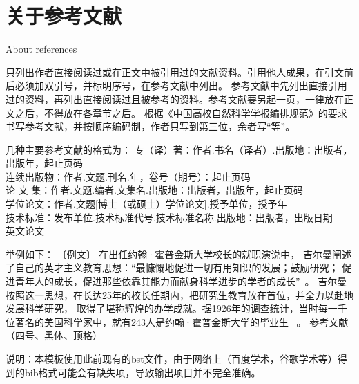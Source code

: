 \chapter{关于参考文献}{About references}

只列出作者直接阅读过或在正文中被引用过的文献资料。引用他人成果，在引文前后必须加双引号，并标明序号，在参考文献中列出。
参考文献中先列出直接引用过的资料，再列出直接阅读过且被参考的资料。参考文献要另起一页，一律放在正文之后，不得放在各章节之后。
根据《中国高校自然科学学报编排规范》的要求书写参考文献，并按顺序编码制，作者只写到第三位，余者写“等”。


几种主要参考文献的格式为：
专（译）著：作者.书名（译者）.出版地：出版者，出版年，起止页码\\
连续出版物：作者.文题.刊名.年，卷号（期号）：起止页码\\
论 文 集：作者.文题.编者.文集名.出版地：出版者，出版年，起止页码\\
学位论文：作者.文题[博士（或硕士）学位论文].授予单位，授予年~\cite{许家林1999岩层移动与控制的关键层理论及其应用}\\
技术标准：发布单位.技术标准代号.技术标准名称.出版地：出版者，出版日期\\
英文论文~\cite{1978Indexing}


举例如下：
〔例文〕 在出任约翰·霍普金斯大学校长的就职演说中，
吉尔曼阐述了自己的英才主义教育思想：“最慷慨地促进一切有用知识的发展；鼓励研究；
促进青年人的成长，促进那些依靠其能力而献身科学进步的学者的成长”~\cite{贺国庆1998德国和美国大学发达史}。 
吉尔曼按照这一思想，在长达25年的校长任期内，把研究生教育放在首位，并全力以赴地发展科学研究，
取得了堪称辉煌的办学成就。据1926年的调查统计，当时每一千位著名的美国科学家中，就有243人是约翰·霍普金斯大学的毕业生~\cite{陈树清1982美国研究生教育发展的历程及其特点} 。
参考文献（四号、黑体、顶格）


说明：本模板使用此前现有的bst文件，由于网络上（百度学术，谷歌学术等）得到的bib格式可能会有缺失项，导致输出项目并不完全准确。
